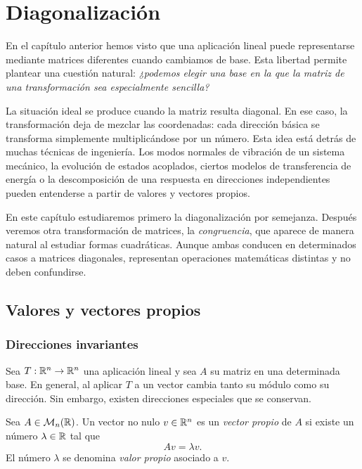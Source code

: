 \chapter{Diagonalización}
\label{ch:diagonalizacion}

En el capítulo anterior hemos visto que una aplicación lineal puede representarse mediante matrices diferentes cuando cambiamos de base. Esta libertad permite plantear una cuestión natural: \emph{¿podemos elegir una base en la que la matriz de una transformación sea especialmente sencilla?}

La situación ideal se produce cuando la matriz resulta diagonal. En ese caso, la transformación deja de mezclar las coordenadas: cada dirección básica se transforma simplemente multiplicándose por un número. Esta idea está detrás de muchas técnicas de ingeniería. Los modos normales de vibración de un sistema mecánico, la evolución de estados acoplados, ciertos modelos de transferencia de energía o la descomposición de una respuesta en direcciones independientes pueden entenderse a partir de valores y vectores propios.

En este capítulo estudiaremos primero la diagonalización por semejanza. Después veremos otra transformación de matrices, la \emph{congruencia}, que aparece de manera natural al estudiar formas cuadráticas. Aunque ambas conducen en determinados casos a matrices diagonales, representan operaciones matemáticas distintas y no deben confundirse.

\section{Valores y vectores propios}
\label{sec:valores-vectores-propios}

\subsection{Direcciones invariantes}

Sea $T:\mathbb{R}^n\to\mathbb{R}^n$ una aplicación lineal y sea $A$ su matriz en una determinada base. En general, al aplicar $T$ a un vector cambia tanto su módulo como su dirección. Sin embargo, existen direcciones especiales que se conservan.

\begin{definition}
Sea $A\in\mathcal M_n(\mathbb{R})$. Un vector no nulo $v\in\mathbb{R}^n$ es un \emph{vector propio} de $A$ si existe un número $\lambda\in\mathbb{R}$ tal que
\[
Av=\lambda v.
\]
El número $\lambda$ se denomina \emph{valor propio} asociado a $v$.
\end{definition}


